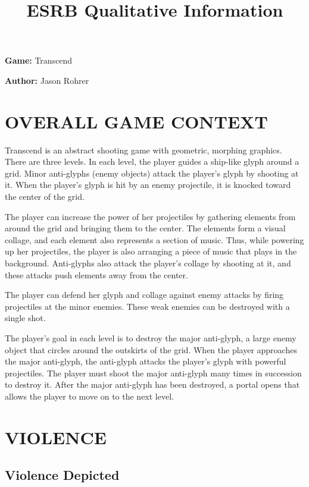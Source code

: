 \documentclass[12pt]{article}
\begin{document}
                            



\title{ESRB Qualitative Information}
\maketitle

{\bf Game:} Transcend

{\bf Author:} Jason Rohrer

\setcounter{section}{3}
\section{OVERALL GAME CONTEXT}

Transcend is an abstract shooting game with geometric, morphing graphics.
There are three levels.  In each level, the player guides a ship-like glyph 
around a grid.  Minor anti-glyphs (enemy objects) attack the player's glyph 
by shooting at it.  When the player's glyph is hit by an enemy projectile, it 
is knocked toward the center of the grid.

The player can increase the power of her projectiles by gathering elements
from around the grid and bringing them to the center.  The elements form
a visual collage, and each element also represents a section of music.
Thus, while powering up her projectiles, the player is also arranging a piece
of music that plays in the background.  Anti-glyphs also attack the player's 
collage by shooting at it, and these attacks push elements away from the 
center.

The player can defend her glyph and collage against enemy attacks by firing projectiles at the minor enemies.
These weak enemies can be destroyed with a single shot.   

The player's goal in each level is to destroy the major anti-glyph, a large
enemy object that circles around the outskirts of the grid.  When the player
approaches the major anti-glyph, the anti-glyph attacks the player's glyph
with powerful projectiles.  The player must shoot the major anti-glyph many
times in succession to destroy it.  After the major anti-glyph has been
destroyed, a portal opens that allows the player to move on to the next level.


\section{VIOLENCE}

\subsection{Violence Depicted}
\end{document}
